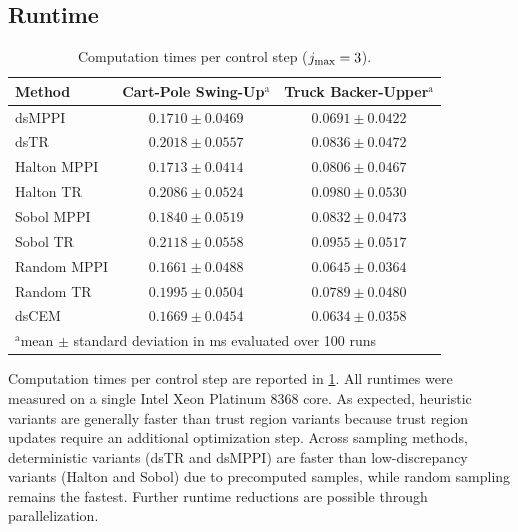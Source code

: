 \subsection{Runtime}

\begin{table}[t]
    \centering    
    \caption{Computation times per control step ($j_\mathrm{max}=3$).}
    \label{tab:computation_times}
    \setlength{\tabcolsep}{2pt}
    {
    \small
    \begin{tabular}{lcc}
        \toprule
        Method      & Cart-Pole Swing-Up$^{\text{a}}$             & Truck Backer-Upper$^{\text{a}}$  
        \\
        \midrule
        dsMPPI      & $\num{0.1710} \pm \num{0.0469}$ & $\num{0.0691} \pm \num{0.0422}$
        \\
        dsTR        & $\num{0.2018} \pm \num{0.0557}$ & $\num{0.0836} \pm \num{0.0472}$                  
        \\
        Halton MPPI & $\num{0.1713} \pm \num{0.0414}$ & $\num{0.0806} \pm \num{0.0467}$
        \\
        Halton TR   & $\num{0.2086} \pm \num{0.0524}$ & $\num{0.0980} \pm \num{0.0530}$
        \\
        Sobol MPPI  & $\num{0.1840} \pm \num{0.0519}$ & $\num{0.0832} \pm \num{0.0473}$
        \\
        Sobol TR    & $\num{0.2118} \pm \num{0.0558}$ & $\num{0.0955} \pm \num{0.0517}$
        \\
        Random MPPI & $\num{0.1661} \pm \num{0.0488}$ & $\num{0.0645} \pm \num{0.0364}$
        \\
        Random TR   & $\num{0.1995} \pm \num{0.0504}$ & $\num{0.0789} \pm \num{0.0480}$
        \\
        dsCEM   & $\num{0.1669} \pm \num{0.0454}$ & $\num{0.0634} \pm \num{0.0358}$
        \\
        \bottomrule
        \multicolumn{3}{l}{\footnotesize $^{\text{a}}$mean $\pm$ standard deviation in \si{\milli\second} evaluated over 100 runs} \\
    \end{tabular}
    }
\end{table}

Computation times per control step are reported in \cref{tab:computation_times}.
% 
All runtimes were measured on a single Intel Xeon Platinum 8368 core.
As expected, heuristic variants are generally faster than trust region variants because trust region updates require an additional optimization step.
Across sampling methods, deterministic variants (dsTR and dsMPPI) are faster than low-discrepancy variants (Halton and Sobol) due to precomputed samples, while random sampling remains the fastest.
Further runtime reductions are possible through parallelization.

